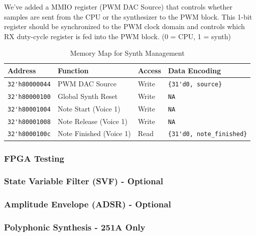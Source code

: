 \documentclass[11pt]{article}
\begin{document}
We've added a MMIO register (PWM DAC Source) that controls whether samples are sent from the CPU or the synthesizer to the PWM block.
This 1-bit register should be synchronized to the PWM clock domain and controls which RX duty-cycle register is fed into the PWM block.
(0 = CPU, 1 = synth)

\begin{table}[hbt]
  \begin{center}
    \caption{Memory Map for Synth Management}
    \label{mem_map2}
    \begin{tabular}{l l l l}
      \toprule
      \textbf{Address} & \textbf{Function} & \textbf{Access} & \textbf{Data Encoding}\\
      \midrule
      \verb|32'h80000044| & PWM DAC Source & Write & \verb|{31'd0, source}| \\
      \midrule
      \verb|32'h80000100| & Global Synth Reset & Write & \verb|NA| \\
      \midrule
      \verb|32'h80001004| & Note Start (Voice 1) & Write & \verb|NA| \\
      \verb|32'h80001008| & Note Release (Voice 1) & Write & \verb|NA| \\
      \verb|32'h8000100c| & Note Finished (Voice 1) & Read & \verb|{31'd0, note_finished}| \\
      \midrule
    \end{tabular}
  \end{center}
\end{table}

\subsubsection{FPGA Testing}

\subsubsection{State Variable Filter (SVF) - Optional}

\subsubsection{Amplitude Envelope (ADSR) - Optional}

\subsubsection{Polyphonic Synthesis - 251A Only}
\end{document}
